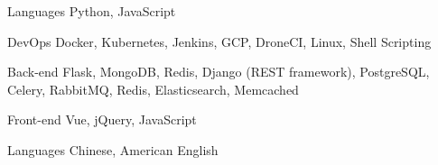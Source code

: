 

\begin{cvskills}

  \cvskill
    {Languages} %
    {Python, JavaScript} %

  \cvskill
    {DevOps} %
    {Docker, Kubernetes, Jenkins, GCP, DroneCI, Linux, Shell Scripting} %

  \cvskill
    {Back-end} %
    {Flask, MongoDB, Redis, Django (REST framework), PostgreSQL, Celery, RabbitMQ, Redis, Elasticsearch, Memcached} %

  \cvskill
    {Front-end} %
    {Vue, jQuery, JavaScript} %


  \cvskill
    {Languages} %
    {Chinese, American English} %

\end{cvskills}
